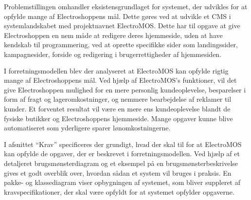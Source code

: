 Problemstillingen omhandler eksistensgrundlaget for systemet, der udvikles for at opfylde mange af Electroshoppens mål. Dette gøres ved at udvikle et CMS i systemlandskabet med projektnavnet ElectroMOS. Dette har til opgave at give Electroshoppen en nem måde at redigere deres hjemmeside, uden at have kendskab til programmering, ved at oprette specifikke sider som landingssider, kampagnesider, forside og redigering i brugerrettigheder af hjemmesiden. 
 
I forretningsmodellen blev der analyseret at ElectroMOS kan opfylde rigtig mange af Electroshoppens mål. Ved hjælp af ElectroMOS’s funktioner, vil det give Electroshoppen mulighed for en mere personlig kundeoplevelse, besparelser i form af fragt og lageromkostninger, og nemmere bearbejdelse af reklamer til kunder. Et forventet resultat vil være en mere ens kundeoplevelse blandt de fysiske butikker og Electroshoppens hjemmeside. Mange opgaver kunne blive automatiseret som yderligere sparer lønomkostningerne.
 
I afsnittet “Krav” specificeres der grundigt, hvad der skal til for at ElectroMOS kan opfylde de opgaver, der er beskrevet i forretningsmodellen. Ved hjælp af et detaljeret brugsmønsterdiagram og et eksempel på en brugsmønsterbeskrivelse gives et godt overblik over, hvordan sådan et system vil bruges i praksis. En pakke- og klassediagram viser opbygningen af systemet, som bliver suppleret af kravspecifikationer, der skal være opfyldt for at systemet opfylder opgaverne. 
